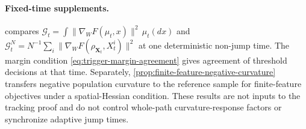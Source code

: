 \paragraph{Fixed-time supplements.}
 compares
$\mathcal G_t=\int\|\nabla_WF(\mu_t,x)\|^2\,\mu_t(dx)$ and
$\mathcal G_t^N=N^{-1}\sum_i\|\nabla_WF(\rho_{\mathbf X_t},X_t^i)\|^2$
at one deterministic non-jump time. The margin condition
\eqref{eq:trigger-margin-agreement} gives agreement of threshold decisions
at that time. Separately,
\cref{prop:finite-feature-negative-curvature} transfers negative
population curvature to the reference sample for finite-feature
objectives under a spatial-Hessian condition.
These results are not inputs to the tracking proof and do not control
whole-path curvature-response factors or synchronize adaptive jump times.
